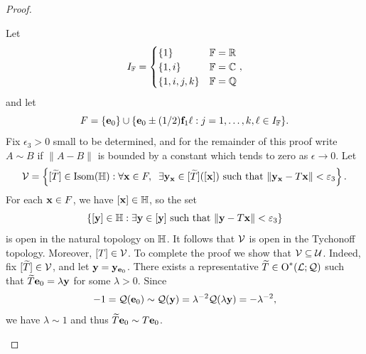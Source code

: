 \begin{proof}
\begin{itemize}
Let
\begin{equation}
\label{IFdef}
I_\F = \begin{cases}
\{1\} & \F = \R\\
\{1,i\} & \F = \C\\
\{1,i,j,k\}& \F = \Q
\end{cases},
\end{equation}
and let
\[
F = \{\ee_0\} \cup \{\ee_0 \pm (1/2)\ff_1 \ell : j = 1,\ldots,k , \ell\in I_\F\}.
\]
Fix $\epsilon_3 > 0$ small to be determined, and for the remainder of this proof write $A\sim B$ if $\|A - B\|$ is bounded by a constant which tends to zero as $\epsilon\to 0$. Let
\[
\VV = \left\{[\w T]\in\Isom(\H): \forall \xx\in F, \;\;\exists \yy_\xx\in [\w T]([\xx]) \text{ such that } \|\yy_\xx - T\xx\| < \epsilon_3\right\}.
\]
For each $\mathbf x\in F$, we have $[\xx]\in\H$, so the set 
\[
\{[\yy]\in\H : \exists \yy\in[\yy] \text{ such that } \|\yy - T\xx\| < \epsilon_3\}
\] 
is open in the natural topology on $\H$. It follows that $\mathcal V$ is open in the Tychonoff topology. Moreover, $[T]\in\mathcal V$. To complete the proof we show that $\mathcal V\subseteq\mathcal U$. Indeed, fix $[\widetilde T]\in\mathcal V$, and let $\mathbf y = \mathbf y_{\mathbf e_0}$. There exists a representative $\widetilde T\in\operatorname{O}^*(\mathcal L;\mathcal Q)$ such that $\widetilde T\mathbf e_0 = \lambda \mathbf y$ for some $\lambda > 0$. Since
\[
-1 = \mathcal Q(\mathbf e_0) \sim \mathcal Q(\mathbf y) = \lambda^{-2}\mathcal Q(\lambda\mathbf y) = -\lambda^{-2},
\]
we have $\lambda\sim 1$ and thus $\widetilde T\mathbf e_0 \sim T\mathbf e_0$.


\end{itemize}
\end{proof}
